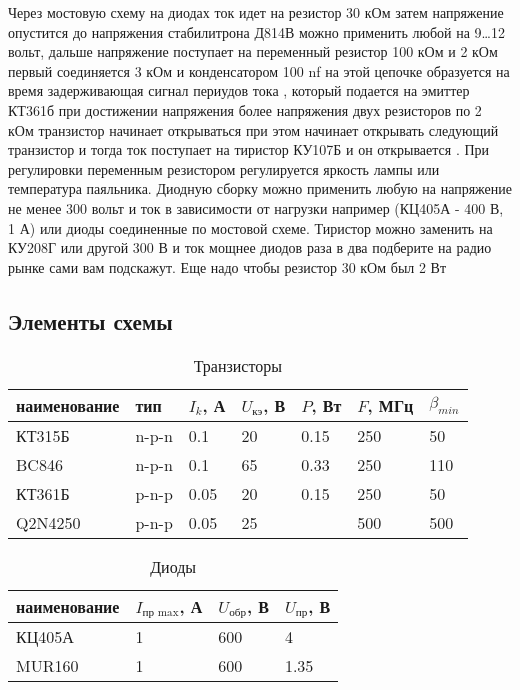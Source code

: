 Через мостовую схему на диодах ток идет на резистор 30 кОм затем напряжение опустится до напряжения стабилитрона Д814В можно применить любой на 9…12 вольт, дальше напряжение поступает на переменный резистор 100 кОм и 2 кОм первый соединяется 3 кОм и конденсатором 100 nf на этой цепочке образуется на время задерживающая сигнал периудов тока , который подается на эмиттер КТ361б при достижении напряжения более напряжения двух резисторов по 2 кОм транзистор начинает открываться при этом начинает открывать следующий транзистор и тогда ток поступает на тиристор КУ107Б и он открывается . При регулировки переменным резистором регулируется яркость лампы или температура паяльника. Диодную сборку можно применить любую на напряжение не менее 300 вольт и ток в зависимости от нагрузки например (КЦ405А - 400 В, 1 А) или диоды соединенные по мостовой схеме. Тиристор можно заменить на КУ208Г или другой 300 В и ток мощнее диодов раза в два подберите на радио рынке сами вам подскажут. Еще надо чтобы резистор 30 кОм был 2 Вт

\subsection{Элементы схемы}

\begin{table}[H]
\begin{center}
	\caption{Транзисторы}
	\def\tabcolsep{10pt}
	\begin{tabular}{|l|l|l|l|l|l|l|}
		\hline
		наименование &
		тип & 
		$I_k$, А &
		$U_\text{кэ}$, В & 
		$P$, Вт & 
		$F$, МГц & 
		$\beta_{min}$ \\ 
		\hline
		КТ315Б &
		n-p-n &
		0.1 &
		20 &
		0.15 &
		250 &
		50 \\
		\hline
		BC846 &
		n-p-n &
		0.1 &
		65 &
		0.33 &
		250 &
		110 \\
		\hline
		КТ361Б &
		p-n-p &
		0.05 &
		20 &
		0.15 &
		250 &
		50 \\
		\hline
		Q2N4250 &
		p-n-p  &
		0.05 &
		25 &
		&
		500 &
		500 \\ 
		\hline
\end{tabular}
\end{center}
\end{table}

\begin{table}[H]
\begin{center}
	\caption{Диоды}
	\def\tabcolsep{10pt}
	\begin{tabular}{|l|l|l|l|}
		\hline
		наименование &
		$I_\text{пр max}$, А &
		$U_\text{обр}$, В &
		$U_\text{пр}$, В \\ 
		\hline
		КЦ405А &
		1 &
		600 &
		4 \\
		\hline
		MUR160 &
		1 &
		600 &
		1.35 \\
		\hline
\end{tabular}
\end{center}
\end{table}

